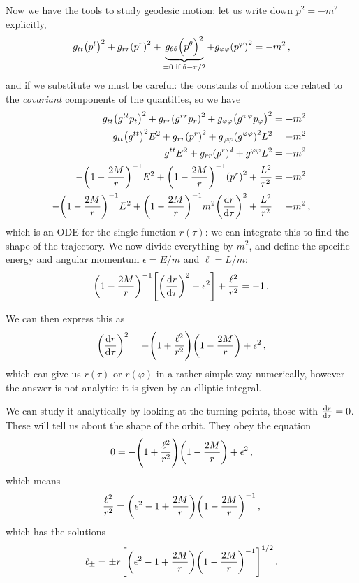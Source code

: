 \documentclass[main.tex]{subfiles}
\begin{document}
Now we have the tools to study geodesic motion: let us write down \(p^2 = -m^2\) explicitly, 
%
\begin{align}
g_{tt} \qty(p^{t})^2 + g_{rr} \qty(p^{r})^2 + \underbrace{g_{\theta \theta } \qty(p^{\theta })^2}_{= 0 \text{ if } \theta \equiv \pi /2} + g_{\varphi \varphi } \qty(p^{\varphi })^2 = - m^2
\,,
\end{align}
%
and if we substitute we must be careful: the constants of motion are related to the \emph{covariant} components of the quantities, so we have 
%
\begin{align}
g_{tt} \qty(g^{tt} p_t)^2 
+ g_{rr} \qty(g^{rr} p_r)^2
+ g_{\varphi \varphi } \qty(g^{\varphi \varphi } p_\varphi )^2
&= - m^2 \\
g_{tt} \qty(g^{tt})^2 E^2 
+ g_{rr} \qty(p^{r})^2
+ g_{\varphi \varphi } \qty(g^{\varphi \varphi })^2 L^2
&= - m^2 \\
 g^{tt} E^2 
+ g_{rr} \qty( p^r)^2
+ g^{\varphi \varphi } L^2
&= - m^2 \\
 -\qty(1 - \frac{2M}{r})^{-1} E^2 
+ \qty(1 - \frac{2M}{r})^{-1} \qty( p^r)^2
+ \frac{L^2}{r^2}
&= - m^2 \\
 -\qty(1 - \frac{2M}{r})^{-1} E^2 
+ \qty(1 - \frac{2M}{r})^{-1} m^2\qty(\dv{r}{\tau })^2
+ \frac{L^2}{r^2}
&= - m^2 
\,,
\end{align}
%
which is an ODE for the single function \(r (\tau )\): we can integrate this to find the shape of the trajectory. 
We now divide everything by \(m^2\), and define the specific energy and angular momentum \(\epsilon = E / m\) and \(\ell = L / m\): 
%
\begin{align}
\qty(1 - \frac{2M}{r})^{-1} \qty[\qty(\dv{r}{\tau })^2 - \epsilon^2]
+ \frac{\ell^2}{r^2} = -1
\,.
\end{align}

We can then express this as 
%
\begin{align}
\qty(\dv{r}{\tau })^2 = - \qty(1 + \frac{\ell^2}{r^2}) \qty(1 - \frac{2M}{r}) + \epsilon^2
\,,
\end{align}
%
which can give us \(r(\tau )\) or \(r(\varphi )\) in a rather simple way numerically, however the answer is not analytic: it is given by an elliptic integral. 

We can study it analytically by looking at the turning points, those with \(\dv{r}{\tau } = 0\).
These will tell us about the shape of the orbit. 
They obey the equation 
%
\begin{align}
0 = - \qty(1 + \frac{\ell^2}{r^2}) \qty(1 - \frac{2M}{r}) + \epsilon^2
\,,
\end{align}
%
which means 
%
\begin{align}
\frac{\ell^2}{r^2} = \qty(\epsilon^2 -1 + \frac{2M}{r}) \qty(1 - \frac{2M}{r})^{-1}
\,,
\end{align}
%
which has the solutions 
%
\begin{align}
\ell_{\pm} = \pm r \qty[ \qty(\epsilon^2 - 1 + \frac{2M}{r}) \qty(1 - \frac{2M}{r})^{-1}]^{1/2}
\,.
\end{align}
\end{document}
